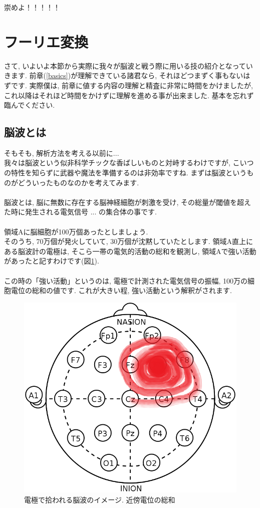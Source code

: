 \documentclass[11pt,a4paper,uplatex]{ujreport} 	%
\begin{document}
崇めよ！！！！！\\

\section{フーリエ変換}
さて, いよいよ本節から実際に我々が脳波と戦う際に用いる技の紹介となっていきます. 前章(\ref{basics})が理解できている諸君なら, それほどつまずく事もないはずです. 実際僕は, 前章に値する内容の理解と精査に非常に時間をかけましたが, これ以降はそれほど時間をかけずに理解を進める事が出来ました. 基本を忘れず臨んでください.
\subsection{脳波とは}
そもそも, 解析方法を考える以前に...\\
我々は脳波という似非科学チックな香ばしいものと対峙するわけですが, こいつの特性を知らずに武器や魔法を準備するのは非効率ですね. まずは脳波というものがどういったものなのかを考えてみます. \\
\\
脳波とは, 脳に無数に存在する脳神経細胞が刺激を受け, その総量が閾値を超えた時に発生される電気信号 ... の集合体の事です.\\
\\
領域Aに脳細胞が100万個あったとしましょう. \\
そのうち, 70万個が発火していて, 30万個が沈黙していたとします. 領域A直上にある脳波計の電極は, そこら一帯の電気的活動の総和を観測し, 領域Aで強い活動があったと記すわけです(図\ref{im:topo}).\\
\\
この時の「強い活動」というのは, 電極で計測された電気信号の振幅, 100万の細胞電位の総和の値です. これが大きい程, 強い活動という解釈がされます.\\

\begin{figure}[H]
\label{im:topo}
  \centering
  \includegraphics[width=120mm,bb=0 0 673 602]{figures/topomap.png}
  \caption{電極で拾われる脳波のイメージ. 近傍電位の総和}
\end{figure}
\end{document}
